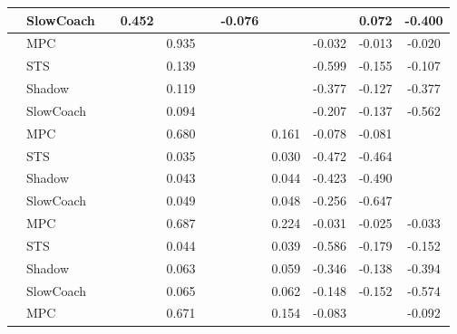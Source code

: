 \begin{tabular}{|l|l|*{9}{c|}}
                                                           & SlowCoach &       &     0.452 &        &     & -0.076 &     &      &   0.072 &   -0.400 \\
\midrule
[False, False, True, False, False, False, True, True, True] & MPC &       &        &     0.935 &     &     &     &  -0.032 &  -0.013 &   -0.020 \\
                                                           & STS &       &        &     0.139 &     &     &     &  -0.599 &  -0.155 &   -0.107 \\
                                                           & Shadow &       &        &     0.119 &     &     &     &  -0.377 &  -0.127 &   -0.377 \\
                                                           & SlowCoach &       &        &     0.094 &     &     &     &  -0.207 &  -0.137 &   -0.562 \\
\midrule
[False, False, True, False, False, True, True, True, False] & MPC &       &        &     0.680 &     &     &  0.161 &  -0.078 &  -0.081 &       \\
                                                           & STS &       &        &     0.035 &     &     &  0.030 &  -0.472 &  -0.464 &       \\
                                                           & Shadow &       &        &     0.043 &     &     &  0.044 &  -0.423 &  -0.490 &       \\
                                                           & SlowCoach &       &        &     0.049 &     &     &  0.048 &  -0.256 &  -0.647 &       \\
\midrule
[False, False, True, False, False, True, True, True, True] & MPC &       &        &     0.687 &     &     &  0.224 &  -0.031 &  -0.025 &   -0.033 \\
                                                           & STS &       &        &     0.044 &     &     &  0.039 &  -0.586 &  -0.179 &   -0.152 \\
                                                           & Shadow &       &        &     0.063 &     &     &  0.059 &  -0.346 &  -0.138 &   -0.394 \\
                                                           & SlowCoach &       &        &     0.065 &     &     &  0.062 &  -0.148 &  -0.152 &   -0.574 \\
\midrule
[False, False, True, False, False, True, True, False, True] & MPC &       &        &     0.671 &     &     &  0.154 &  -0.083 &      &   -0.092 \\

\end{tabular}

